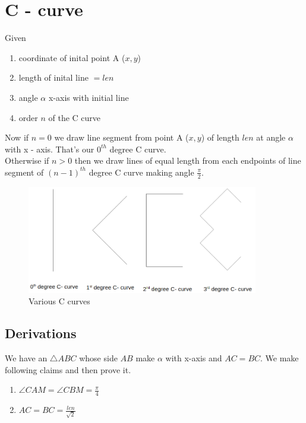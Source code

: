 \documentclass{article}
\begin{document}
\section{C - curve}

Given 

\begin{enumerate}
    \item coordinate of inital point A (\(x,y \))
    \item length of inital line \(= len \)
    \item angle \(\alpha\) x-axis with initial line
    \item order \(n\) of the C curve
\end{enumerate}

Now if \(n=0 \) we draw line segment from point A (\(x,y \)) of length \(len \) at angle \(\alpha \) with x - axis. That's our \(0^{th} \) degree C curve.\\
Otherwise if \(n > 0\) then we draw lines of equal length from each endpoints of line segment of \((n-1)^{th}\) degree C curve making angle \(\frac{\pi}{2}\).

\begin{figure}[h]
    \centering
    \includegraphics[width=0.9\textwidth]{figures/c0123}
    \caption{Various C curves}
\end{figure}
\subsection{Derivations}

We have an \(\triangle ABC\) whose side \(AB\) make \(\alpha \) with x-axis and \(AC = BC\).
We make following claims and then prove it.

\begin{enumerate}[label=\roman*.,start=1]
    \item \(\angle CAM = \angle CBM = \frac{\pi}{4} \)
    \item \(AC = BC = \frac{len}{\sqrt{2}}\)
\end{enumerate}
\end{document}

